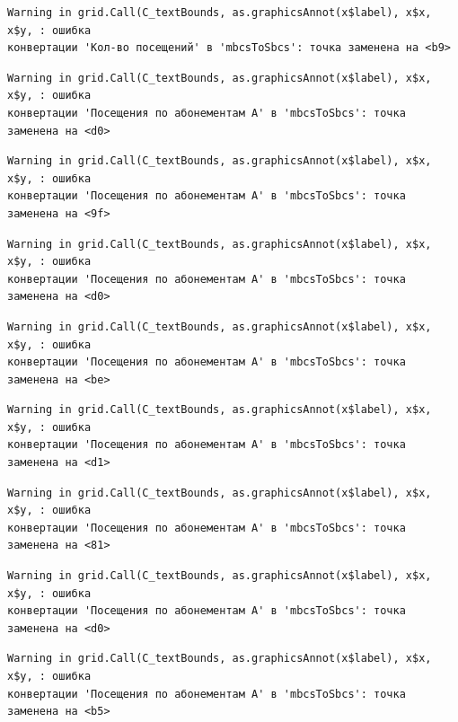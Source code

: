 \documentclass[
  letterpaper,
  DIV=11,
  numbers=noendperiod]{scrreprt}
\begin{document}
\begin{verbatim}
Warning in grid.Call(C_textBounds, as.graphicsAnnot(x$label), x$x, x$y, : ошибка
конвертации 'Кол-во посещений' в 'mbcsToSbcs': точка заменена на <b9>
\end{verbatim}

\begin{verbatim}
Warning in grid.Call(C_textBounds, as.graphicsAnnot(x$label), x$x, x$y, : ошибка
конвертации 'Посещения по абонементам А' в 'mbcsToSbcs': точка заменена на <d0>
\end{verbatim}

\begin{verbatim}
Warning in grid.Call(C_textBounds, as.graphicsAnnot(x$label), x$x, x$y, : ошибка
конвертации 'Посещения по абонементам А' в 'mbcsToSbcs': точка заменена на <9f>
\end{verbatim}

\begin{verbatim}
Warning in grid.Call(C_textBounds, as.graphicsAnnot(x$label), x$x, x$y, : ошибка
конвертации 'Посещения по абонементам А' в 'mbcsToSbcs': точка заменена на <d0>
\end{verbatim}

\begin{verbatim}
Warning in grid.Call(C_textBounds, as.graphicsAnnot(x$label), x$x, x$y, : ошибка
конвертации 'Посещения по абонементам А' в 'mbcsToSbcs': точка заменена на <be>
\end{verbatim}

\begin{verbatim}
Warning in grid.Call(C_textBounds, as.graphicsAnnot(x$label), x$x, x$y, : ошибка
конвертации 'Посещения по абонементам А' в 'mbcsToSbcs': точка заменена на <d1>
\end{verbatim}

\begin{verbatim}
Warning in grid.Call(C_textBounds, as.graphicsAnnot(x$label), x$x, x$y, : ошибка
конвертации 'Посещения по абонементам А' в 'mbcsToSbcs': точка заменена на <81>
\end{verbatim}

\begin{verbatim}
Warning in grid.Call(C_textBounds, as.graphicsAnnot(x$label), x$x, x$y, : ошибка
конвертации 'Посещения по абонементам А' в 'mbcsToSbcs': точка заменена на <d0>
\end{verbatim}

\begin{verbatim}
Warning in grid.Call(C_textBounds, as.graphicsAnnot(x$label), x$x, x$y, : ошибка
конвертации 'Посещения по абонементам А' в 'mbcsToSbcs': точка заменена на <b5>
\end{verbatim}
\end{document}
